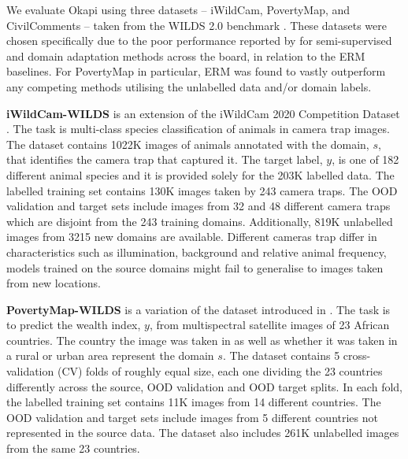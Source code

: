 We evaluate Okapi using three datasets -- iWildCam, PovertyMap, and CivilComments -- taken from the
WILDS 2.0 benchmark
\citep{SagWeiLeeGaoetal22}.
%
These datasets were chosen specifically due to the poor performance reported by
\citet{SagWeiLeeGaoetal22} for semi-supervised and domain adaptation methods across the board, in
relation to the ERM baselines.
%
For PovertyMap in particular, ERM was found to vastly outperform any competing methods utilising
the unlabelled data and/or domain labels.


\textbf{iWildCam-WILDS} is an extension of the iWildCam 2020 Competition Dataset
\citep{beery2020iwildcam}. 
%
The task is multi-class species classification  of animals in camera trap images. The dataset
contains 1022K images of animals annotated with the domain, $s$, that identifies the camera trap
that captured it. The target label, $y$, is one of 182 different animal species and it is provided
solely for the 203K labelled data. The labelled training set contains 130K images taken by 243 camera traps. 
%
The \ac{OOD} validation and target sets include images from 32 and 48 different camera traps which
are disjoint from the 243 training domains.
%
Additionally, 819K unlabelled images from 3215 new domains are available. %
Different cameras trap differ in characteristics such as illumination, background and relative
animal frequency, models trained on the source domains might fail to generalise to images taken
from new locations.


\textbf{PovertyMap-WILDS} is a variation of the dataset introduced in \citet{yeh2020using}.
%
The task is to predict the wealth index, $y$, from multispectral satellite images of 23 African
countries. The country the image was taken in as well as whether it was taken in a rural or urban
area represent the domain $s$. The dataset contains 5 cross-validation (CV) folds of roughly equal
size, each one dividing the 23 countries differently across the source, OOD validation and OOD
target splits. In each fold, the labelled training set contains 11K images from 14 different
countries. The OOD validation and target sets include images from 5 different countries not
represented in the source data.
%
The dataset also includes 261K unlabelled images from the same 23 countries. 

